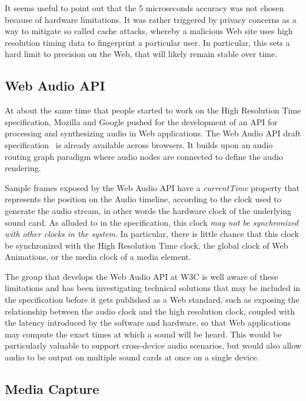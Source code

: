 It seems useful to point out that the 5 microseconds accuracy was not chosen
because of hardware limitations. It was rather triggered by privacy concerns
as a way to mitigate so called cache attacks, whereby a malicious Web site
uses high resolution timing data to fingerprint a particular user. In
particular, this sets a hard limit to precision on the Web, that will likely
remain stable over time.


\subsection{Web Audio API}
\label{sec:webaudio}

At about the same time that people started to work on the High Resolution Time
specification, Mozilla and Google pushed for the development of an API for
processing and synthesizing audio in Web applications. The Web Audio API draft
specification~\cite{webaudio} is already available across browsers. It builds upon an
audio routing graph paradigm where audio nodes are connected to define the
audio rendering.

Sample frames exposed by the Web Audio API have a \emph{currentTime} property that
represents the position on the Audio timeline, according to the clock used to
generate the audio stream, in other words the hardware clock of the underlying
sound card. As alluded to in the specification, this clock \emph{may not be
synchronized with other clocks in the system}. In particular, there is little
chance that this clock be synchronized with the High Resolution Time clock,
the global clock of Web Animations, or the media clock of a media element.

The group that develops the Web Audio API at W3C is well aware of these
limitations and has been investigating technical solutions that may be
included in the specification before it gets published as a Web standard, such
as exposing the relationship between the audio clock and the high resolution
clock, coupled with the latency introduced by the software and hardware, so
that Web applications may compute the exact times at which a sound will be
heard. This would be particularly valuable to support cross-device audio
scenarios, but would also allow audio to be output on multiple sound cards at
once on a single device.


\subsection{Media Capture}
\label{sec:capture}

